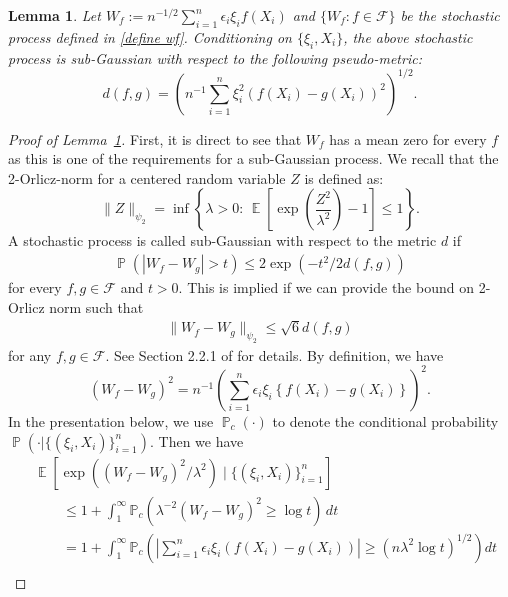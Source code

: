 \documentclass[12pt]{article}
\DeclareMathOperator*{\E}{\mathbb{E}}
\DeclareMathOperator*{\Prob}{\mathbb{P}}
\newtheorem{lemma}[theorem]{Lemma}
\begin{document}
\begin{appendices}
\begin{lemma}
\label{wf is subgaussian lemma}
Let $W_f :=  n^{-1/2}\sum_{i=1}^n \epsilon_i \xi_i f(X_i)$ and $\{W_f : f \in \mathcal{F}\}$ be the stochastic process defined in \eqref{define wf}. Conditioning on $\{\xi_i, X_i\}$, the above stochastic process is sub-Gaussian with respect to the following pseudo-metric:
\begin{equation}\nonumber
    d(f,g) = \left(n^{-1}\sum_{i=1}^n \xi_i^2 \left(f(X_i) - g(X_i)\right)^2\right)^{1/2}.
\end{equation}
\end{lemma}
\begin{proof}[Proof of Lemma~\ref{wf is subgaussian lemma}]
First, it is direct to see that $W_f$ has a mean zero for every $f$ as this is one of the requirements for a sub-Gaussian process. We recall that the 2-Orlicz-norm for a centered random variable $Z$ is defined as:
\begin{equation}
    \|Z\|_{\psi_2} = \inf \left\{ \lambda > 0:\,  \E\left[\exp\left(\frac{Z^2}{\lambda^2}\right) -1\right]\leq 1\right \}\nonumber.
\end{equation}
A stochastic process is called sub-Gaussian with respect to the metric $d$ if
\begin{align}
	\Prob(|W_f-W_g| > t) \le 2\exp(-t^2/2d(f,g))\nonumber
\end{align}
for every $f,g\in \mathcal{F}$ and $t > 0$. This is implied if we can provide the bound on 2-Orlicz norm such that 
\begin{align}
	\|W_f-W_g\|_{\psi_2} \le \sqrt{6}d(f,g)\nonumber
\end{align}
for any $f,g\in \mathcal{F}$. See Section 2.2.1 of \cite{van1996weak} for details. 
By definition, we have
\begin{equation}\nonumber
    \left(W_f-W_g\right)^2=n^{-1}\left(\sum_{i=1}^n \epsilon_i \xi_i\left\{f\left(X_i\right)-g\left(X_i\right)\right\}\right)^2.
\end{equation}
In the presentation below, we use $ \Prob_c(\cdot)$ to denote the conditional probability $\Prob(\cdot | \{(\xi_i,X_i)\}_{i=1}^n)$. 
Then we have
\begin{equation}\nonumber
    \begin{aligned}
    &\E[\exp((W_f - W_g)^2/\lambda^2)\mid \{(\xi_i,X_i)\}_{i=1}^n]\\
    &\qquad  \leq 1+\int_1^{\infty} \mathbb{P}_c\left(\lambda^{-2}\left(W_f-W_g\right)^2 \geq \log t\right) \, d t\\
    & \qquad= 1 + \int_1^\infty \mathbb{P}_c\left( \left|\sum_{i=1}^n \epsilon_i \xi_i \left(f(X_i) - g(X_i)\right)\right|\geq (n\lambda^2 \log t)^{1/2}\right) dt\\

\end{aligned}
\end{equation}
\end{proof}
\end{appendices}
\end{document}
